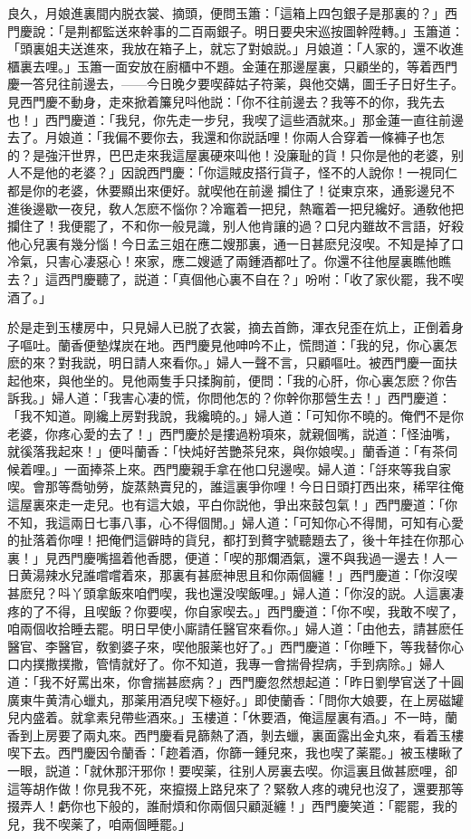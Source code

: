 良久，月娘進裏間内脱衣裳、摘頭，便問玉簫：「這箱上四包銀子是那裏的？」西門慶說：「是荆都監送來幹事的二百兩銀子。明日要央宋巡按圖幹陞轉。」玉簫道：「頭裏姐夫送進來，我放在箱子上，就忘了對娘説。」月娘道：「人家的，還不收進櫃裏去哩。」玉簫一面安放在廚櫃中不題。金蓮在那邊屋裏，只顧坐的，等着西門慶一答兒往前邊去，——今日晚夕要喫薛姑子符薬，與他交媾，圖壬子日好生子。見西門慶不動身，走來掀着簾兒呌他説：「你不往前邊去？我等不的你，我先去也！」西門慶道：「我兒，你先走一步兒，我喫了這些酒就來。」那金蓮一直往前邊去了。月娘道：「我偏不要你去，我還和你説話哩！你兩人合穿着一條褲子也怎的？是強汗世界，巴巴走來我這屋裏硬來叫他！没廉耻的貨！只你是他的老婆，别人不是他的老婆？」因說西門慶：「你這賊皮搭行貨子，怪不的人說你！一視同仁都是你的老婆，休要顯出來便好。就喫他在前邊𢺞攔住了！従東京來，通影邊兒不進後邊歇一夜兒，敎人怎麽不惱你？冷竈着一把兒，熱竈着一把兒纔好。通敎他把攔住了！我便罷了，不和你一般見識，别人他肯讓的過？口兒内雖故不言語，好殺他心兒裏有幾分惱！今日孟三姐在應二嫂那裏，通一日甚麽兒沒喫。不知是掉了口冷氣，只害心凄惡心！來家，應二嫂遞了兩鍾酒都吐了。你還不往他屋裏瞧他瞧去？」這西門慶聽了，説道：「真個他心裏不自在？」吩咐：「收了家伙罷，我不喫酒了。」

於是走到玉樓房中，只見婦人已脱了衣裳，摘去首飾，渾衣兒歪在炕上，正倒着身子嘔吐。蘭香便墊煤炭在地。西門慶見他呻吟不止，慌問道：「我的兒，你心裏怎麽的來？對我説，明日請人來看你。」婦人一聲不言，只顧嘔吐。被西門慶一面扶起他來，與他坐的。見他兩隻手只揉胸前，便問：「我的心肝，你心裏怎麽？你告訴我。」婦人道：「我害心凄的慌，你問他怎的？你幹你那營生去！」西門慶道：「我不知道。剛纔上房對我說，我纔曉的。」婦人道：「可知你不曉的。俺們不是你老婆，你疼心愛的去了！」西門慶於是摟過粉項來，就親個嘴，説道：「怪油嘴，就徯落我起來！」便呌蘭香：「快炖好苦艷茶兒來，與你娘喫。」蘭香道：「有茶伺候着哩。」一面捧茶上來。西門慶親手拿在他口兒邊喫。婦人道：「㧱來等我自家喫。會那等喬劬勞，旋蒸熱賣兒的，誰這裏爭你哩！今日日頭打西出來，稀罕往俺這屋裏來走一走兒。也有這大娘，平白你説他，爭出來鼓包氣！」西門慶道：「你不知，我這兩日七事八事，心不得個閒。」婦人道：「可知你心不得閒，可知有心愛的扯落着你哩！把俺們這僻時的貨兒，都打到贅字號聽題去了，後十年挂在你那心裏！」見西門慶嘴搵着他香腮，便道：「喫的那爛酒氣，還不與我過一邊去！人一日黄湯辣水兒誰嚐嚐着來，那裏有甚麽神思且和你兩個纏！」西門慶道：「你沒喫甚麽兒？呌丫頭拿飯來咱們喫，我也還没喫飯哩。」婦人道：「你沒的説。人這裏凄疼的了不得，且喫飯？你要喫，你自家喫去。」西門慶道：「你不喫，我敢不喫了，咱兩個收拾睡去罷。明日早使小廝請任醫官來看你。」婦人道：「由他去，請甚麽任醫官、李醫官，敎劉婆子來，喫他服薬也好了。」西門慶道：「你睡下，等我替你心口内撲撒撲撒，管情就好了。你不知道，我專一會揣骨揑病，手到病除。」婦人道：「我不好罵出來，你會揣甚麽病？」西門慶忽然想起道：「昨日劉學官送了十圓廣東牛黄清心蠟丸，那薬用酒兒喫下極好。」即使蘭香：「問你大娘要，在上房磁罐兒内盛着。就拿素兒帶些酒來。」玉樓道：「休要酒，俺這屋裏有酒。」不一時，蘭香到上房要了兩丸來。西門慶看見篩熱了酒，剝去蠟，裏面露出金丸來，看着玉樓喫下去。西門慶因令蘭香：「趂着酒，你篩一鍾兒來，我也喫了薬罷。」被玉樓瞅了一眼，説道：「就休那汗邪你！要喫薬，往别人房裏去喫。你這裏且做甚麽哩，卻這等胡作做！你見我不死，來攛掇上路兒來了？緊敎人疼的魂兒也沒了，還要那等掇弄人！虧你也下般的，誰耐煩和你兩個只顧涎纏！」西門慶笑道：「罷罷，我的兒，我不喫薬了，咱兩個睡罷。」


